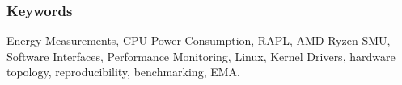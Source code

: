 \subsubsection*{Keywords}

Energy Measurements, CPU Power Consumption, RAPL, AMD Ryzen SMU,
Software Interfaces, Performance Monitoring, Linux, Kernel Drivers,
hardware topology, reproducibility, benchmarking, EMA.
